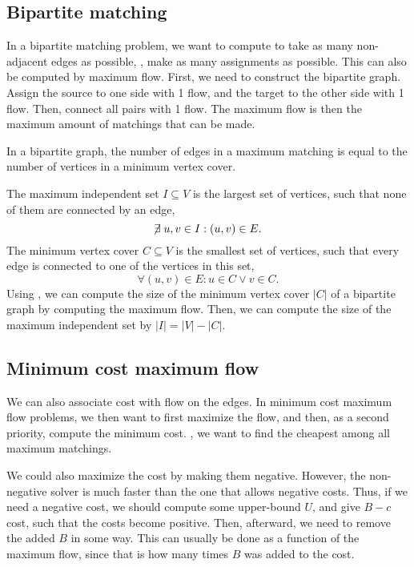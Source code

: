 \documentclass[justified,nobib]{tufte-handout}
\begin{document}
\subsection{Bipartite matching}

In a bipartite matching problem, we want to compute to take as many
non-adjacent edges as possible, \ie, make as many assignments as possible. This
can also be computed by maximum flow. First, we need to construct the bipartite
graph. Assign the source to one side with 1 flow, and the target to the other
side with 1 flow. Then, connect all pairs with 1 flow. The maximum flow is then
the maximum amount of matchings that can be made.

\begin{theorem}[K\"onig]
    \label{thm:konig}

    In a bipartite graph, the number of edges in a maximum matching is equal to
    the number of vertices in a minimum vertex cover.
\end{theorem}

The maximum independent set $I\subseteq V$ is the largest set of vertices, such
that none of them are connected by an edge, \[
    \centernot \exists u,v\in I : (u,v) \in E.
\]
The minimum vertex cover $C \subseteq V$ is the smallest set of vertices, such
that every edge is connected to one of the vertices in this set, \[
    \forall (u,v) \in E : u \in C \lor v \in C.
\]
Using , we can compute the size of the minimum vertex cover
$|C|$ of a bipartite graph by computing the maximum flow. Then, we can compute
the size of the maximum independent set by $|I| = |V| - |C|$.

\subsection{Minimum cost maximum flow}


We can also associate cost with flow on the edges. In minimum cost maximum flow
problems, we then want to first maximize the flow, and then, as a second
priority, compute the minimum cost. \Ie, we want to find the cheapest among
all maximum matchings.

We could also maximize the cost by making them negative. However, the
non-negative solver is much faster than the one that allows negative costs.
Thus, if we need a negative cost, we should compute some upper-bound $U$, and
give $B-c$ cost, such that the costs become positive. Then, afterward, we need
to remove the added $B$ in some way. This can usually be done as a function of
the maximum flow, since that is how many times $B$ was added to the cost.
\end{document}
